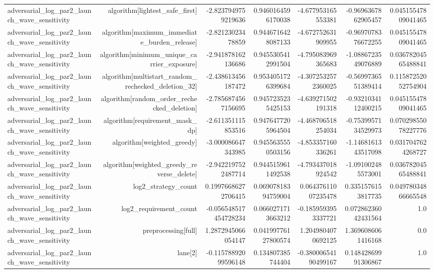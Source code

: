 {\begin{longtable}{lrrrrrr}
adversarial\_log\_par2\_launch\_wave\_sensitivity & algorithm[lightest\_safe\_first] & -2.8237949759219636 & 0.9460164596170038 & -4.677953165553381 & -0.9696367862905457 & 0.04515547809041465 \\
adversarial\_log\_par2\_launch\_wave\_sensitivity & algorithm[maximum\_immediate\_burden\_release] & -2.82123023478859 & 0.9446716428087133 & -4.672752631909955 & -0.9697078376672255 & 0.04515547809041465 \\
adversarial\_log\_par2\_launch\_wave\_sensitivity & algorithm[minimum\_unique\_carrier\_exposure] & -2.941878162136686 & 0.9455305412991504 & -4.795083969365683 & -1.0886723549076889 & 0.03678204565488841 \\
adversarial\_log\_par2\_launch\_wave\_sensitivity & algorithm[multistart\_random\_rechecked\_deletion\_32] & -2.438613456187472 & 0.9534051726399684 & -4.3072532572360025 & -0.5699736551389414 & 0.11587252052754904 \\
adversarial\_log\_par2\_launch\_wave\_sensitivity & algorithm[random\_order\_rechecked\_deletion] & -2.7856874567156695 & 0.9457235235425153 & -4.639271502191318 & -0.9321034112400215 & 0.04515547809041465 \\
adversarial\_log\_par2\_launch\_wave\_sensitivity & algorithm[requirement\_mask\_dp] & -2.611351115853516 & 0.9476477205964504 & -4.468706518254034 & -0.7539957134529973 & 0.07029855078227776 \\
adversarial\_log\_par2\_launch\_wave\_sensitivity & algorithm[weighted\_greedy] & -3.000086647343985 & 0.9455635550503156 & -4.853357160336261 & -1.1468161343517098 & 0.0317047624268727 \\
adversarial\_log\_par2\_launch\_wave\_sensitivity & algorithm[weighted\_greedy\_reverse\_delete] & -2.9422197522487714 & 0.9445159611492538 & -4.793437018924542 & -1.091002485573001 & 0.03678204565488841 \\
adversarial\_log\_par2\_launch\_wave\_sensitivity & log2\_strategy\_count & 0.19976686272706415 & 0.06907818394759004 & 0.06437611007235478 & 0.3351576153817735 & 0.04978034866665548 \\
adversarial\_log\_par2\_launch\_wave\_sensitivity & log2\_requirement\_count & -0.056548517454728234 & 0.0660271713663212 & -0.1859593953337721 & 0.07286236042431564 & 1.0 \\
adversarial\_log\_par2\_launch\_wave\_sensitivity & preprocessing[full] & 1.2872945066054147 & 0.04199776127800574 & 1.2049804070692125 & 1.3696086061416168 & 0.0 \\
adversarial\_log\_par2\_launch\_wave\_sensitivity & lane[2] & -0.11578892099596148 & 0.134807385744404 & -0.38000654190499167 & 0.14842869991306867 & 1.0 \\

\end{longtable}}
